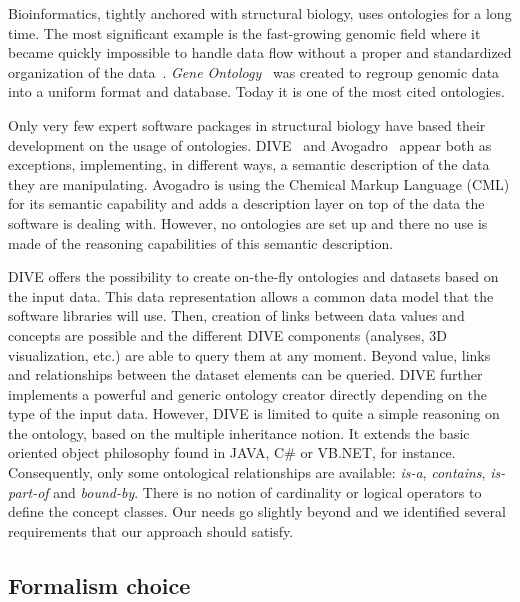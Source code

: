 \documentclass{vgtc}                          %
\begin{document}
Bioinformatics, tightly anchored with structural biology, uses ontologies for a long time. The most significant example is the fast-growing genomic field where it became quickly impossible to handle data flow without a proper and standardized organization of the data~\cite{schuurman_ontologies_2008}. \textit{Gene Ontology}~\cite{ashburner_gene_2000} was created to regroup genomic data into a uniform format and database. Today it is one of the most cited ontologies. 

Only very few expert software packages in structural biology have based their development on the usage of ontologies. DIVE~\cite{rysavy_dive:_2014} and Avogadro~\cite{hanwell2012avogadro} appear both as exceptions, implementing, in different ways, a semantic description of the data they are manipulating. Avogadro is using the Chemical Markup Language (CML) for its semantic capability and adds a description layer on top of the data the software is dealing with. However, no ontologies are set up and there no use is made of the reasoning capabilities of this semantic description. 

DIVE offers the possibility to create on-the-fly ontologies and datasets based on the input data. This data representation allows a common data model that the software libraries will use. Then, creation of links between data values and concepts are possible and the different DIVE components (analyses, 3D visualization, etc.) are able to query them at any moment. Beyond value, links and relationships between the dataset elements can be queried. DIVE further implements a powerful and generic ontology creator directly depending on the type of the input data. However, DIVE is limited to quite a simple reasoning on the ontology, based on the multiple inheritance notion. It extends the basic oriented object philosophy found in JAVA, C\# or VB.NET, for instance. Consequently, only some ontological relationships are available: \textit{is-a}, \textit{contains}, \textit{is-part-of} and \textit{bound-by}. There is no notion of cardinality or logical operators to define the concept classes. Our needs go slightly beyond and we identified several requirements that our approach should satisfy.


\subsection{Formalism choice}
\end{document}
